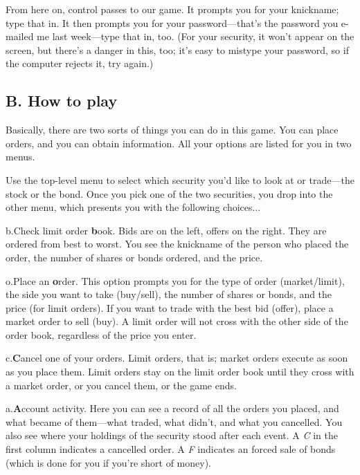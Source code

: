 From here on, control passes to our game.  It prompts you for your
knickname; type that in.  It then prompts you for your
password---that's the password you e-mailed me last week---type that
in, too.  (For your security, it won't appear on the screen, but
there's a danger in this, too; it's easy to mistype your password, so
if the computer rejects it, try again.)

\subsection{B. How to play}%
Basically, there are two sorts of things you can do in this game.
You can place orders, and you can obtain information.  All your
options are listed for you in two menus.

Use the top-level menu to select which security you'd like to look at
or trade---the stock or the bond.%
 Once you pick one of the two securities, you
drop into the other menu, which presents you with the following
choices...

\item{b.}Check limit order {\bf b}ook.
Bids are on the left, offers on the right.  They are ordered from
best to worst.  You see the knickname of the person who placed the
order, the number of shares or bonds ordered, and the price.

\item{o.}Place an {\bf o}rder.
This option prompts you for the type of order (market/limit), the
side you want to take (buy/sell), the number of shares or bonds, and
the price (for limit orders).  If you want to trade with the best bid
(offer), place a market order to sell (buy).  A limit order will not
cross with the other side of the order book, regardless of the price
you enter.

\item{c.}{\bf C}ancel one of your orders.
Limit orders, that is; market orders execute as soon as you place them.
Limit orders stay on the limit order book until they cross with a market
order, or you cancel them, or the game ends.

\item{a.}{\bf A}ccount activity.
Here you can see a record of all the orders you placed, and what
became of them---what traded, what didn't, and what you cancelled.
You also see where your holdings of the security stood after each
event.  A {\it C} in the first column indicates a cancelled order. A
{\it F} indicates an forced sale of bonds (which is done for you if
you're short of money).

